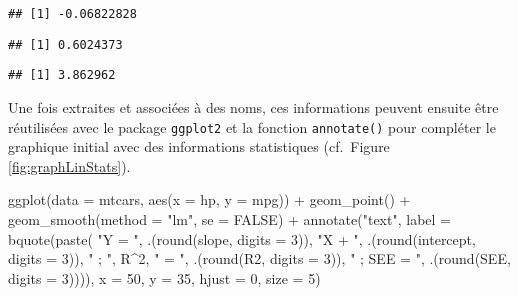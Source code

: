 \documentclass[
]{book}
\newenvironment{Shaded}{\begin{snugshade}}{\end{snugshade}}
\newcommand{\AttributeTok}[1]{\textcolor[rgb]{0.77,0.63,0.00}{#1}}
\newcommand{\CommentTok}[1]{\textcolor[rgb]{0.56,0.35,0.01}{\textit{#1}}}
\newcommand{\ConstantTok}[1]{\textcolor[rgb]{0.00,0.00,0.00}{#1}}
\newcommand{\DecValTok}[1]{\textcolor[rgb]{0.00,0.00,0.81}{#1}}
\newcommand{\FunctionTok}[1]{\textcolor[rgb]{0.00,0.00,0.00}{#1}}
\newcommand{\NormalTok}[1]{#1}
\newcommand{\OtherTok}[1]{\textcolor[rgb]{0.56,0.35,0.01}{#1}}
\newcommand{\SpecialCharTok}[1]{\textcolor[rgb]{0.00,0.00,0.00}{#1}}
\newcommand{\StringTok}[1]{\textcolor[rgb]{0.31,0.60,0.02}{#1}}
\begin{document}
\begin{verbatim}
## [1] -0.06822828
\end{verbatim}

\begin{Shaded}
\end{Shaded}

\begin{verbatim}
## [1] 0.6024373
\end{verbatim}

\begin{Shaded}
\end{Shaded}

\begin{verbatim}
## [1] 3.862962
\end{verbatim}

Une fois extraites et associées à des noms, ces informations peuvent ensuite être réutilisées avec le package \texttt{ggplot2} et la fonction \texttt{annotate()} pour compléter le graphique initial avec des informations statistiques (cf.~Figure \ref{fig:graphLinStats}).

\begin{Shaded}
\begin{Highlighting}[]
\FunctionTok{ggplot}\NormalTok{(}\AttributeTok{data =}\NormalTok{ mtcars, }\FunctionTok{aes}\NormalTok{(}\AttributeTok{x =}\NormalTok{ hp, }\AttributeTok{y =}\NormalTok{ mpg)) }\SpecialCharTok{+}
  \FunctionTok{geom\_point}\NormalTok{() }\SpecialCharTok{+}
  \FunctionTok{geom\_smooth}\NormalTok{(}\AttributeTok{method =} \StringTok{"lm"}\NormalTok{, }\AttributeTok{se =} \ConstantTok{FALSE}\NormalTok{) }\SpecialCharTok{+}
  \FunctionTok{annotate}\NormalTok{(}\StringTok{"text"}\NormalTok{, }\AttributeTok{label =} \FunctionTok{bquote}\NormalTok{(}\FunctionTok{paste}\NormalTok{(}
    \StringTok{"Y = "}\NormalTok{, .(}\FunctionTok{round}\NormalTok{(slope, }\AttributeTok{digits =} \DecValTok{3}\NormalTok{)), }\StringTok{"X + "}\NormalTok{, }
\NormalTok{     .(}\FunctionTok{round}\NormalTok{(intercept, }\AttributeTok{digits =} \DecValTok{3}\NormalTok{)), }\StringTok{" ; "}\NormalTok{,}
\NormalTok{     R}\SpecialCharTok{\^{}}\DecValTok{2}\NormalTok{, }\StringTok{" = "}\NormalTok{, .(}\FunctionTok{round}\NormalTok{(R2, }\AttributeTok{digits =} \DecValTok{3}\NormalTok{)), }
     \StringTok{" ; SEE = "}\NormalTok{, .(}\FunctionTok{round}\NormalTok{(SEE, }\AttributeTok{digits =} \DecValTok{3}\NormalTok{)))), }
           \AttributeTok{x =} \DecValTok{50}\NormalTok{, }\AttributeTok{y =} \DecValTok{35}\NormalTok{, }\AttributeTok{hjust =} \DecValTok{0}\NormalTok{, }\AttributeTok{size =} \DecValTok{5}\NormalTok{)}
\end{Highlighting}
\end{Shaded}
\end{document}
